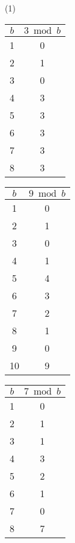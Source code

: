 \vfill
\noindent
(1)
\begin{minipage}{0.32\textwidth}
    \centering
    \begin{tabular}{c|c}
        $b$ & $3 \bmod b$ \\
        \hline
        1   & 0           \\
        2   & 1           \\
        3   & 0           \\
        4   & 3           \\
        5   & 3           \\
        6   & 3           \\
        7   & 3           \\
        8   & 3           \\
    \end{tabular}
\end{minipage}%
\begin{minipage}{0.32\textwidth}
    \centering
    \begin{tabular}{c|c}
        $b$ & $9 \bmod b$ \\
        \hline
        1   & 0           \\
        2   & 1           \\
        3   & 0           \\
        4   & 1           \\
        5   & 4           \\
        6   & 3           \\
        7   & 2           \\
        8   & 1           \\
        9   & 0           \\
        10  & 9           \\
    \end{tabular}
\end{minipage}%
\begin{minipage}{0.32\textwidth}
    \centering
    \begin{tabular}{c|c}
        $b$ & $7 \bmod b$ \\
        \hline
        1   & 0           \\
        2   & 1           \\
        3   & 1           \\
        4   & 3           \\
        5   & 2           \\
        6   & 1           \\
        7   & 0           \\
        8   & 7           \\
    \end{tabular}
\end{minipage}

